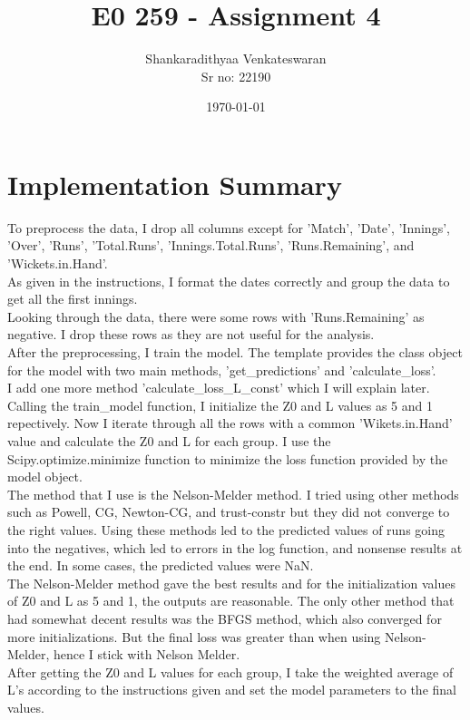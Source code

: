 \documentclass[12pt]{article}
\title{E0 259 - Assignment 4}
\author{Shankaradithyaa Venkateswaran\\ Sr no: 22190}
\date{\today}
\begin{document}
\begin{titlepage}
    \maketitle
\end{titlepage}

\section{Implementation Summary}
To preprocess the data, I drop all columns except for 'Match', 'Date', 'Innings', 'Over', 'Runs', 'Total.Runs', 'Innings.Total.Runs', 'Runs.Remaining', and 'Wickets.in.Hand'.\\
As given in the instructions, I format the dates correctly and group the data to get all the first innings.\\
Looking through the data, there were some rows with 'Runs.Remaining' as negative. I drop these rows as they are not useful for the analysis.\\
After the preprocessing, I train the model. The template provides the class object for the model with two main methods, 'get\_predictions' and 'calculate\_loss'.\\
I add one more method 'calculate\_loss\_L\_const' which I will explain later.\\
Calling the train\_model function, I initialize the Z0 and L values as 5 and 1 repectively. Now I iterate through all the rows with a common 'Wikets.in.Hand' value and calculate the Z0 and L for each group. I use the Scipy.optimize.minimize function to minimize the loss function provided by the model object.\\
The method that I use is the Nelson-Melder method. I tried using other methods such as Powell, CG, Newton-CG, and trust-constr but they did not converge to the right values. Using these methods led to the predicted values of runs going into the negatives, which led to errors in the log function, and nonsense results at the end. In some cases, the predicted values were NaN.\\
The Nelson-Melder method gave the best results and for the initialization values of Z0 and L as 5 and 1, the outputs are reasonable. The only other method that had somewhat decent results was the BFGS method, which also converged for more initializations. But the final loss was greater than when using Nelson-Melder, hence I stick with Nelson Melder.\\
After getting the Z0 and L values for each group, I take the weighted average of L's according to the instructions given and set the model parameters to the final values.\\
\end{document}

